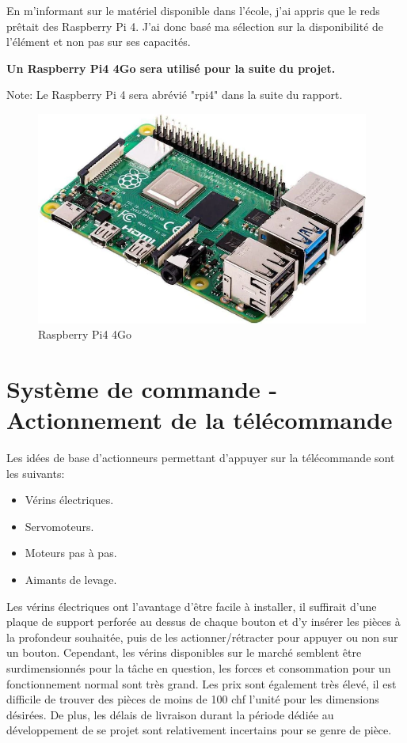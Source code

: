 En m'informant sur le matériel disponible dans l'école, j'ai appris que le \Gls{reds} prêtait des Raspberry Pi 4.
J'ai donc basé ma sélection sur la disponibilité de l'élément et non pas sur ses capacités.

\textbf{Un Raspberry Pi4 4Go sera utilisé pour la suite du projet.}

Note: Le Raspberry Pi 4 sera abrévié "\Gls{rpi4}" dans la suite du rapport.

\begin{figure}[H]
    \centering
    \includegraphics[height=7cm]{assets/figures/rpi4.png}
    \caption{Raspberry Pi4 4Go}
\end{figure}

\newpage
\section{Système de commande - Actionnement de la télécommande}
Les idées de base d'actionneurs permettant d'appuyer sur la télécommande sont les suivants:
\begin{itemize}
    \item Vérins électriques.
    \item Servomoteurs.
    \item Moteurs pas à pas.
    \item Aimants de levage.
\end{itemize}

Les vérins électriques ont l'avantage d'être facile à installer, il suffirait d'une plaque de support perforée au dessus de chaque bouton et d'y insérer
les pièces à la profondeur souhaitée, puis de les actionner/rétracter pour appuyer ou non sur un bouton. Cependant, les vérins disponibles sur le marché semblent être surdimensionnés pour la tâche en question, les forces et
consommation pour un fonctionnement normal sont très grand. Les prix sont également très élevé, il est difficile de trouver des pièces de moins de 100 \Gls{chf} l'unité
pour les dimensions désirées. De plus, les délais de livraison durant la période dédiée au développement de se projet sont relativement incertains pour se genre de pièce.


